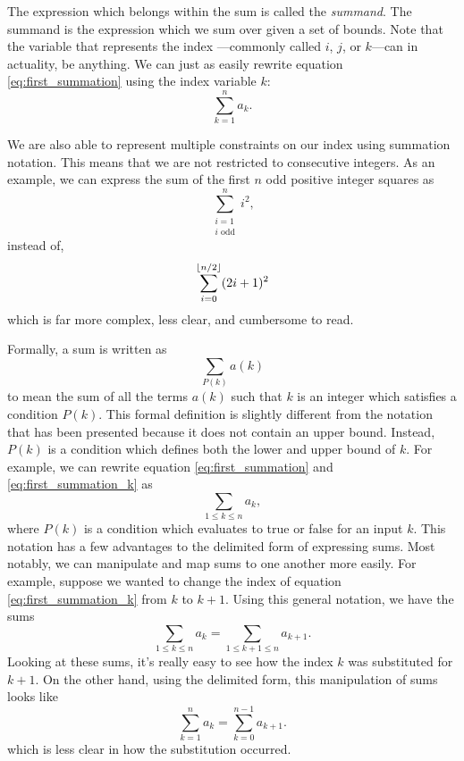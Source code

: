 \documentclass[prereq]{cslesson}
\numberwithin{equation}{section}
\begin{document}
The expression which belongs within the sum is called the \textit{summand}. The summand is the expression which we sum
over given a set of bounds. Note that the variable that represents the index ---commonly called $i$, $j$, or $k$---can in actuality, be anything. We can just as easily rewrite equation \ref{eq:first_summation} using the index variable $k$:
\begin{equation}
    \sum^n_{k=1}a_k.
    \label{eq:first_summation_k}
\end{equation}

We are also able to represent multiple constraints on our index using summation notation. This means that we are not restricted
to consecutive integers. As an example, we can express the sum of the first $n$ odd positive integer squares as
\begin{equation*}
    \sum^n_{\substack{i=1 \\ i\text{ odd}}}i^2,
\end{equation*}
instead of,
\begin{equation*}
    \sum^{\floor*{n/2}}_{i=0}(2i+1)^2
\end{equation*}
which is far more complex, less clear, and cumbersome to read.

Formally, a sum is written as
\begin{equation}
    \sum_{P(k)}a(k)
\end{equation}
to mean the sum of all the terms $a(k)$ such that $k$ is an integer which satisfies a condition $P(k)$. This formal definition is slightly different from the notation that has been presented because it does not contain an upper bound. Instead, $P(k)$ is a condition which defines both the lower and upper bound of $k$. For example, we can rewrite equation \ref{eq:first_summation} and \ref{eq:first_summation_k} as
\begin{equation*}
    \sum_{1 \leq k \leq n}a_k,
\end{equation*}
where $P(k)$ is a condition which evaluates to true or false for an input $k$. This notation has a few advantages to the delimited form of expressing sums. Most notably, we can manipulate and map sums to one another more easily. For example, suppose we wanted to change the index of equation \ref{eq:first_summation_k} from $k$ to $k+1$. Using this general notation, we have the sums
\begin{equation*}
    \sum_{1\leq k \leq n}{a_k}=\sum_{1\leq k+1 \leq n}{a_{k+1}}.
\end{equation*}
Looking at these sums, it's really easy to see how the index $k$ was substituted for $k+1$. On the other hand, using the delimited form, this manipulation of sums looks like
\begin{equation*}
    \sum^n_{k=1}a_k=\sum^{n-1}_{k=0}a_{k+1}.
\end{equation*}
which is less clear in how the substitution occurred.
\end{document}
